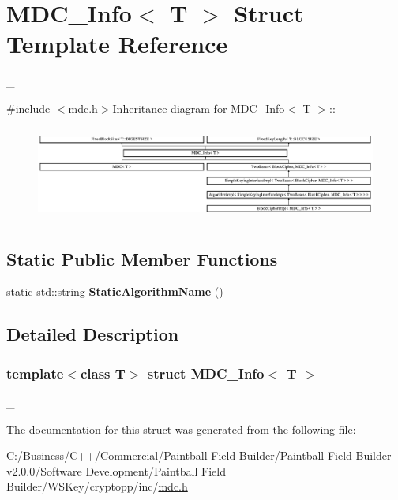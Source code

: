 \hypertarget{struct_m_d_c___info}{
\section{MDC\_\-Info$<$ T $>$ Struct Template Reference}
\label{struct_m_d_c___info}
}


\_\-  


{\ttfamily \#include $<$mdc.h$>$}Inheritance diagram for MDC\_\-Info$<$ T $>$::\begin{figure}[H]
\begin{center}
\leavevmode
\includegraphics[height=3.12268cm]{struct_m_d_c___info}
\end{center}
\end{figure}
\subsection*{Static Public Member Functions}
\begin{DoxyCompactItemize}
\item 
\hypertarget{struct_m_d_c___info_ab543405d9cb03df225ccbd57b419862f}{
static std::string {\bfseries StaticAlgorithmName} ()}
\label{struct_m_d_c___info_ab543405d9cb03df225ccbd57b419862f}

\end{DoxyCompactItemize}


\subsection{Detailed Description}
\subsubsection*{template$<$class T$>$ struct MDC\_\-Info$<$ T $>$}

\_\- 

The documentation for this struct was generated from the following file:\begin{DoxyCompactItemize}
\item 
C:/Business/C++/Commercial/Paintball Field Builder/Paintball Field Builder v2.0.0/Software Development/Paintball Field Builder/WSKey/cryptopp/inc/\hyperlink{mdc_8h}{mdc.h}\end{DoxyCompactItemize}
